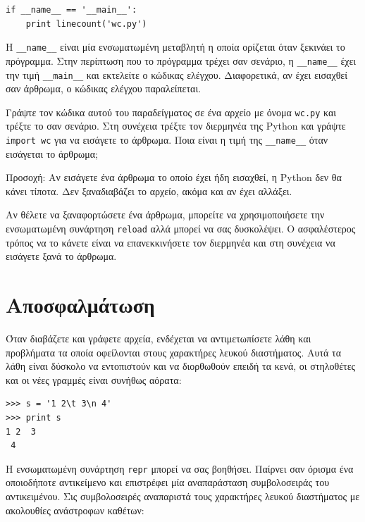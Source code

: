 \documentclass[10pt]{book}
\begin{document}
\begin{verbatim}
if __name__ == '__main__':
    print linecount('wc.py')
\end{verbatim}
%
Η \verb"__name__" είναι μία ενσωματωμένη μεταβλητή η οποία ορίζεται όταν ξεκινάει το πρόγραμμα.
Στην περίπτωση που το πρόγραμμα τρέχει σαν σενάριο, η \verb"__name__" έχει την τιμή \verb"__main__" και
εκτελείτε ο κώδικας ελέγχου. Διαφορετικά, αν έχει εισαχθεί σαν άρθρωμα, ο κώδικας ελέγχου παραλείπεται.
\\
\begin{exercise}

Γράψτε τον κώδικα αυτού του παραδείγματος σε ένα αρχείο με όνομα {\tt wc.py} και τρέξτε το σαν σενάριο.
Στη συνέχεια τρέξτε τον διερμηνέα της Python και γράψτε {\tt import wc} για να εισάγετε το άρθρωμα.
Ποια είναι η τιμή της \verb"__name__" όταν εισάγεται το άρθρωμα;

Προσοχή: Αν εισάγετε ένα άρθρωμα το οποίο έχει ήδη εισαχθεί, η Python δεν θα κάνει τίποτα.
Δεν ξαναδιαβάζει το αρχείο, ακόμα και αν έχει αλλάξει.

Αν θέλετε να ξαναφορτώσετε ένα άρθρωμα, μπορείτε να χρησιμοποιήσετε την ενσωματωμένη συνάρτηση {\tt reload} αλλά
μπορεί να σας δυσκολέψει. Ο ασφαλέστερος τρόπος να το κάνετε είναι να επανεκκινήσετε τον διερμηνέα και στη
συνέχεια να εισάγετε ξανά το άρθρωμα. 
\end{exercise}



\section{Αποσφαλμάτωση}

Όταν διαβάζετε και γράφετε αρχεία, ενδέχεται να αντιμετωπίσετε λάθη και προβλήματα τα οποία οφείλονται στους
χαρακτήρες λευκού διαστήματος. Αυτά τα λάθη είναι δύσκολο να εντοπιστούν και να διορθωθούν επειδή τα κενά, οι
στηλοθέτες και οι νέες γραμμές είναι συνήθως αόρατα:

\begin{verbatim}
>>> s = '1 2\t 3\n 4'
>>> print s
1 2	 3
 4
\end{verbatim}

Η ενσωματωμένη συνάρτηση {\tt repr} μπορεί να σας βοηθήσει. Παίρνει σαν όρισμα ένα οποιοδήποτε αντικείμενο και επιστρέφει μία αναπαράσταση συμβολοσειράς του αντικειμένου. Σις συμβολοσειρές αναπαριστά τους χαρακτήρες λευκού διαστήματος με ακολουθίες ανάστροφων καθέτων:
\end{document}
